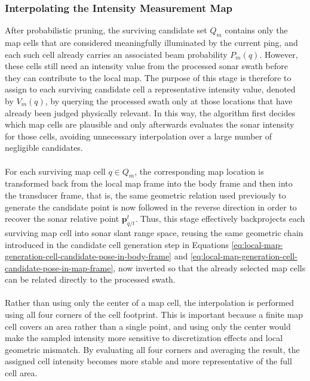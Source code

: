 


\newpage



\subsubsection{Interpolating the Intensity Measurement Map}
After probabilistic pruning, the surviving candidate set $Q_m$ contains only the map cells that are considered meaningfully illuminated by the current ping, and each such cell already carries an associated beam probability $P_m(q)$. However, these cells still need an intensity value from the processed sonar swath before they can contribute to the local map. The purpose of this stage is therefore to assign to each surviving candidate cell a representative intensity value, denoted by $V_m(q)$, by querying the processed swath only at those locations that have already been judged physically relevant. In this way, the algorithm first decides which map cells are plausible and only afterwards evaluates the sonar intensity for those cells, avoiding unnecessary interpolation over a large number of negligible candidates.
\\ \\
For each surviving map cell $q \in Q_m$, the corresponding map location is transformed back from the local map frame into the body frame and then into the transducer frame, that is, the same geometric relation used previously to generate the candidate point is now followed in the reverse direction in order to recover the sonar relative point $\mathbf{p}_{q/t}^{t}$. Thus, this stage effectively backprojects each surviving map cell into sonar slant range space, reusing the same geometric chain introduced in the candidate cell generation step in Equations \ref{eq:local-map-generation-cell-candidate-pose-in-body-frame} and \ref{eq:local-map-generation-cell-candidate-pose-in-map-frame}, now inverted so that the already selected map cells can be related directly to the processed swath.
\\ \\
Rather than using only the center of a map cell, the interpolation is performed using all four corners of the cell footprint. This is important because a finite map cell covers an area rather than a single point, and using only the center would make the sampled intensity more sensitive to discretization effects and local geometric mismatch. By evaluating all four corners and averaging the result, the assigned cell intensity becomes more stable and more representative of the full cell area.
